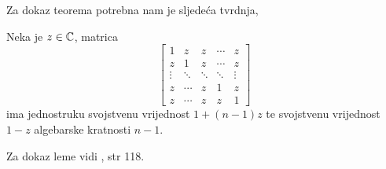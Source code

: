 \documentclass[a4paper,twoside,12pt]{memoir} %
\begin{document}
Za dokaz teorema potrebna nam je sljede\'ca tvrdnja,
\begin{lem}\label{lem:5:11}
    Neka je $z \in \mathbb{C}$, matrica 
    \begin{equation*}
        \begin{bmatrix*}
            1 & z & z & \cdots & z \\
            z & 1 & z & \cdots & z \\
            \vdots & \ddots & \ddots & \ddots & \vdots \\ 
            z & \cdots & z & 1 & z \\
            z & \cdots & z & z & 1 
        \end{bmatrix*}
    \end{equation*}
    ima jednostruku svojstvenu vrijednost $1+(n-1)z$ te svojstvenu vrijednost $1-z$ algebarske kratnosti $n-1$.
\end{lem}
\noindent Za dokaz leme vidi \cite{foucart13}, str 118.
 
\end{document}

